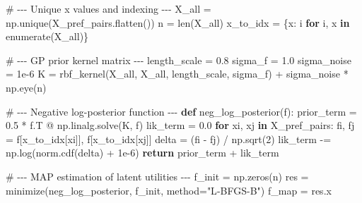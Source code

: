 \documentclass[
  letterpaper,
  numbers=noenddot,
  DIV=11]{scrreprt}
\newenvironment{Shaded}{\begin{snugshade}}{\end{snugshade}}
\newcommand{\BuiltInTok}[1]{\textcolor[rgb]{0.00,0.23,0.31}{#1}}
\newcommand{\CommentTok}[1]{\textcolor[rgb]{0.37,0.37,0.37}{#1}}
\newcommand{\ControlFlowTok}[1]{\textcolor[rgb]{0.00,0.23,0.31}{\textbf{#1}}}
\newcommand{\DecValTok}[1]{\textcolor[rgb]{0.68,0.00,0.00}{#1}}
\newcommand{\FloatTok}[1]{\textcolor[rgb]{0.68,0.00,0.00}{#1}}
\newcommand{\KeywordTok}[1]{\textcolor[rgb]{0.00,0.23,0.31}{\textbf{#1}}}
\newcommand{\NormalTok}[1]{\textcolor[rgb]{0.00,0.23,0.31}{#1}}
\newcommand{\OperatorTok}[1]{\textcolor[rgb]{0.37,0.37,0.37}{#1}}
\newcommand{\StringTok}[1]{\textcolor[rgb]{0.13,0.47,0.30}{#1}}
\theoremstyle{plain}
\theoremstyle{definition}
\theoremstyle{remark}
\begin{document}
\begin{Shaded}
\begin{Highlighting}[numbers=left,,]
\CommentTok{\# {-}{-}{-} Unique x values and indexing {-}{-}{-}}
\NormalTok{X\_all }\OperatorTok{=}\NormalTok{ np.unique(X\_pref\_pairs.flatten())}
\NormalTok{n }\OperatorTok{=} \BuiltInTok{len}\NormalTok{(X\_all)}
\NormalTok{x\_to\_idx }\OperatorTok{=}\NormalTok{ \{x: i }\ControlFlowTok{for}\NormalTok{ i, x }\KeywordTok{in} \BuiltInTok{enumerate}\NormalTok{(X\_all)\}}

\CommentTok{\# {-}{-}{-} GP prior kernel matrix {-}{-}{-}}
\NormalTok{length\_scale }\OperatorTok{=} \FloatTok{0.8}
\NormalTok{sigma\_f }\OperatorTok{=} \FloatTok{1.0}
\NormalTok{sigma\_noise }\OperatorTok{=} \FloatTok{1e{-}6}
\NormalTok{K }\OperatorTok{=}\NormalTok{ rbf\_kernel(X\_all, X\_all, length\_scale, sigma\_f) }\OperatorTok{+}\NormalTok{ sigma\_noise }\OperatorTok{*}\NormalTok{ np.eye(n)}

\CommentTok{\# {-}{-}{-} Negative log{-}posterior function {-}{-}{-}}
\KeywordTok{def}\NormalTok{ neg\_log\_posterior(f):}
\NormalTok{    prior\_term }\OperatorTok{=} \FloatTok{0.5} \OperatorTok{*}\NormalTok{ f.T }\OperatorTok{@}\NormalTok{ np.linalg.solve(K, f)}
\NormalTok{    lik\_term }\OperatorTok{=} \FloatTok{0.0}
    \ControlFlowTok{for}\NormalTok{ xi, xj }\KeywordTok{in}\NormalTok{ X\_pref\_pairs:}
\NormalTok{        fi, fj }\OperatorTok{=}\NormalTok{ f[x\_to\_idx[xi]], f[x\_to\_idx[xj]]}
\NormalTok{        delta }\OperatorTok{=}\NormalTok{ (fi }\OperatorTok{{-}}\NormalTok{ fj) }\OperatorTok{/}\NormalTok{ np.sqrt(}\DecValTok{2}\NormalTok{)}
\NormalTok{        lik\_term }\OperatorTok{{-}=}\NormalTok{ np.log(norm.cdf(delta) }\OperatorTok{+} \FloatTok{1e{-}6}\NormalTok{)}
    \ControlFlowTok{return}\NormalTok{ prior\_term }\OperatorTok{+}\NormalTok{ lik\_term}

\CommentTok{\# {-}{-}{-} MAP estimation of latent utilities {-}{-}{-}}
\NormalTok{f\_init }\OperatorTok{=}\NormalTok{ np.zeros(n)}
\NormalTok{res }\OperatorTok{=}\NormalTok{ minimize(neg\_log\_posterior, f\_init, method}\OperatorTok{=}\StringTok{"L{-}BFGS{-}B"}\NormalTok{)}
\NormalTok{f\_map }\OperatorTok{=}\NormalTok{ res.x}


\end{Highlighting}
\end{Shaded}
\end{document}
